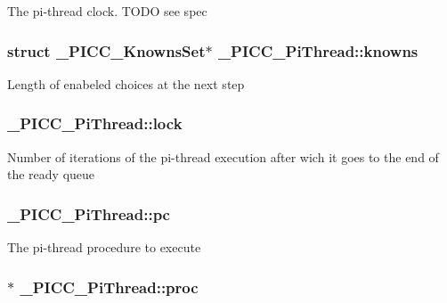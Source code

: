 The pi-\/thread clock. T\-O\-D\-O see spec \hypertarget{struct__PICC__PiThread_aa1110c046d4ccd425e20e5a99de6dbac}{
\subsubsection[{knowns}]{\setlength{\rightskip}{0pt plus 5cm}struct {\bf \-\_\-\-P\-I\-C\-C\-\_\-\-Knowns\-Set}$\ast$ \-\_\-\-P\-I\-C\-C\-\_\-\-Pi\-Thread\-::knowns}}\label{struct__PICC__PiThread_aa1110c046d4ccd425e20e5a99de6dbac}
Length of enabeled choices at the next step \hypertarget{struct__PICC__PiThread_a83441acd517b78752c3766872623b1e6}{
\subsubsection[{lock}]{ \-\_\-\-P\-I\-C\-C\-\_\-\-Pi\-Thread\-::lock}}\label{struct__PICC__PiThread_a83441acd517b78752c3766872623b1e6}
Number of iterations of the pi-\/thread execution after wich it goes to the end of the ready queue \hypertarget{struct__PICC__PiThread_a92b638ec192f3beaa4b3a509124a539d}{
\subsubsection[{pc}]{ \-\_\-\-P\-I\-C\-C\-\_\-\-Pi\-Thread\-::pc}}\label{struct__PICC__PiThread_a92b638ec192f3beaa4b3a509124a539d}
The pi-\/thread procedure to execute \hypertarget{struct__PICC__PiThread_a2ad879cabbe165e57b105c4060c565a1}{
\subsubsection[{proc}]{$\ast$ \-\_\-\-P\-I\-C\-C\-\_\-\-Pi\-Thread\-::proc}}\label{struct__PICC__PiThread_a2ad879cabbe165e57b105c4060c565a1}
